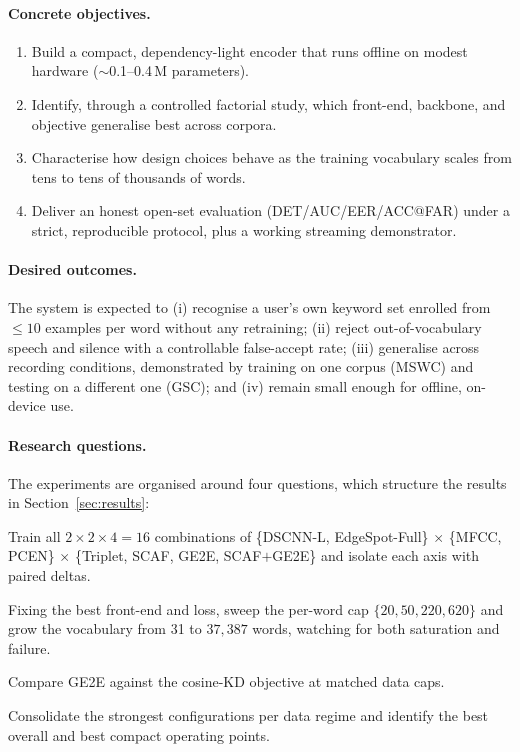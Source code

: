 \documentclass[12pt,a4paper]{article}
\begin{document}
\paragraph{Concrete objectives.}
\begin{enumerate}[leftmargin=1.6em,itemsep=2pt]
\item Build a compact, dependency-light encoder that runs offline on modest
hardware ($\sim$0.1--0.4\,M parameters).
\item Identify, through a controlled factorial study, which front-end, backbone,
and objective generalise best across corpora.
\item Characterise how design choices behave as the training vocabulary scales
from tens to tens of thousands of words.
\item Deliver an honest open-set evaluation (DET/AUC/EER/ACC@FAR) under a strict,
reproducible protocol, plus a working streaming demonstrator.
\end{enumerate}

\paragraph{Desired outcomes.}
The system is expected to (i) recognise a user's own keyword set enrolled from
$\le 10$ examples per word without any retraining; (ii) reject out-of-vocabulary
speech and silence with a controllable false-accept rate; (iii) generalise across
recording conditions, demonstrated by training on one corpus (MSWC) and testing
on a different one (GSC); and (iv) remain small enough for offline, on-device use.

\paragraph{Research questions.}
The experiments are organised around four questions, which structure the results
in Section~\ref{sec:results}:
\begin{description}[leftmargin=1.8em,itemsep=2pt]
\item[\textbf{Q1 --- Which design axis matters?}] Train all
$2{\times}2{\times}4 = 16$ combinations of \{DSCNN-L, EdgeSpot-Full\} $\times$
\{MFCC, PCEN\} $\times$ \{Triplet, SCAF, GE2E, SCAF$+$GE2E\} and isolate each
axis with paired deltas.
\item[\textbf{Q2 --- How does performance scale?}] Fixing the best front-end and
loss, sweep the per-word cap $\{20,50,220,620\}$ and grow the vocabulary from 31
to $37{,}387$ words, watching for both saturation and failure.
\item[\textbf{Q3 --- Can distillation replace data?}] Compare GE2E against the
cosine-KD objective at matched data caps.
\item[\textbf{Q4 --- What is the best deployable system?}] Consolidate the
strongest configurations per data regime and identify the best overall and best
compact operating points.
\end{description}
\end{document}
